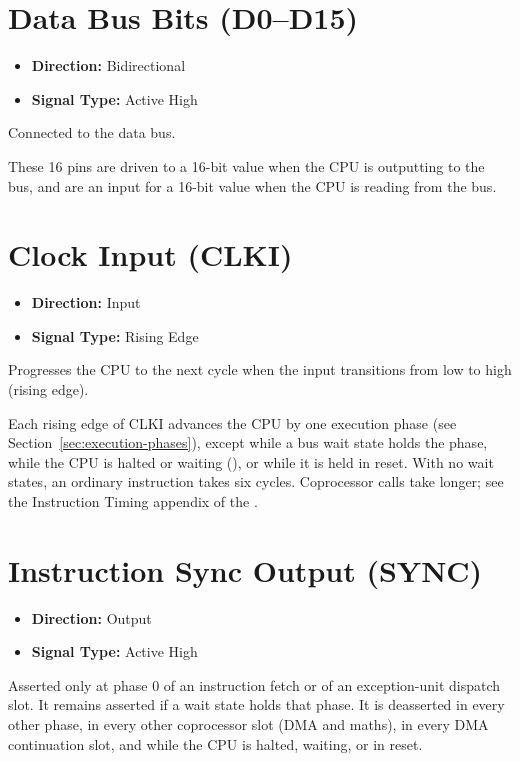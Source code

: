 \section{Data Bus Bits (D0--D15)}

\begin{itemize}
	\item \textbf{Direction:} Bidirectional
	\item \textbf{Signal Type:} Active High
\end{itemize}

Connected to the data bus.

These 16 pins are driven to a 16-bit value when the CPU is outputting to the bus, and are an input for a 16-bit value
when the CPU is reading from the bus.

\section{Clock Input (CLKI)}

\begin{itemize}
	\item \textbf{Direction:} Input
	\item \textbf{Signal Type:} Rising Edge
\end{itemize}

Progresses the CPU to the next cycle when the input transitions from low to high (rising edge).

Each rising edge of CLKI advances the CPU by one execution phase (see Section~\ref{sec:execution-phases}), except while
a bus wait state holds the phase, while the CPU is halted or waiting (), or while it is held in reset.
With no wait states, an ordinary instruction takes six cycles. Coprocessor calls take longer; see the Instruction
Timing appendix of the \archmanual{}.

\section{Instruction Sync Output (SYNC)}

\begin{itemize}
	\item \textbf{Direction:} Output
	\item \textbf{Signal Type:} Active High
\end{itemize}

Asserted only at phase 0 of an instruction fetch or of an exception-unit dispatch slot. It remains asserted if a wait
state holds that phase. It is deasserted in every other phase, in every other coprocessor slot (DMA and maths), in
every DMA continuation slot, and while the CPU is halted, waiting, or in reset.

